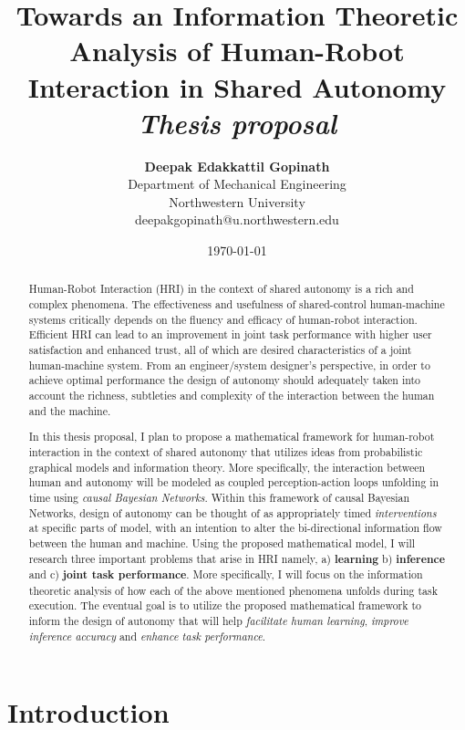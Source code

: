 \documentclass[12pt]{article}
\title{{\bf Towards an Information Theoretic Analysis of Human-Robot Interaction in Shared Autonomy} \\
\it Thesis proposal}
\author{ {\bf Deepak Edakkattil Gopinath}  \\
Department of Mechanical Engineering \\
Northwestern University\\
{\small deepakgopinath@u.northwestern.edu}
}
\date{\today}
\begin{document}
\pagestyle{plain}
\maketitle

\pagebreak
\begin{abstract}
Human-Robot Interaction (HRI) in the context of shared autonomy is a rich and complex phenomena. The effectiveness and usefulness of shared-control human-machine systems critically depends on the fluency and efficacy of human-robot interaction. Efficient HRI can lead to an improvement in joint task performance with higher user satisfaction and enhanced trust, all of which are desired characteristics of a joint human-machine system. From an engineer/system designer's perspective, in order to achieve optimal performance the design of autonomy should adequately taken into account the richness, subtleties and complexity of the interaction between the human and the machine.

In this thesis proposal, I plan to propose a mathematical framework for human-robot interaction in the context of shared autonomy that utilizes ideas from probabilistic graphical models and information theory. More specifically, the interaction between human and autonomy will be modeled as coupled perception-action loops unfolding in time using \textit{causal Bayesian Networks}. Within this framework of causal Bayesian Networks, design of autonomy can be thought of as appropriately timed \textit{interventions} at specific parts of model, with an intention to alter the bi-directional information flow between the human and machine. Using the proposed mathematical model, I will research three important problems that arise in HRI namely, a) \textbf{learning} b) \textbf{inference} and c) \textbf{joint task performance}. More specifically, I will focus on the information theoretic analysis of how each of the above mentioned phenomena unfolds during task execution. The eventual goal is to utilize the proposed mathematical framework to inform the design of autonomy that will help \textit{facilitate human learning}, \textit{improve inference accuracy} and \textit{enhance task performance}.
\end{abstract}

\pagebreak
\tableofcontents
\pagebreak

\cleardoublepage
{}

\section{Introduction}
\label{sec:intro}
\end{document}
